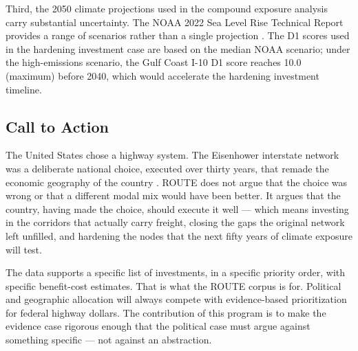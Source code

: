 Third, the 2050 climate projections used in the compound exposure analysis carry substantial uncertainty. The NOAA 2022 Sea Level Rise Technical Report provides a range of scenarios rather than a single projection \citep{NOAA_SLR2022}. The D1 scores used in the hardening investment case are based on the median NOAA scenario; under the high-emissions scenario, the Gulf Coast I-10 D1 score reaches 10.0 (maximum) before 2040, which would accelerate the hardening investment timeline.

\subsection{Call to Action}

The United States chose a highway system. The Eisenhower interstate network was a deliberate national choice, executed over thirty years, that remade the economic geography of the country \citep{Michaels2008,TRB_NHS2018}. ROUTE does not argue that the choice was wrong or that a different modal mix would have been better. It argues that the country, having made the choice, should execute it well --- which means investing in the corridors that actually carry freight, closing the gaps the original network left unfilled, and hardening the nodes that the next fifty years of climate exposure will test.

The data supports a specific list of investments, in a specific priority order, with specific benefit-cost estimates. That is what the ROUTE corpus is for. Political and geographic allocation will always compete with evidence-based prioritization for federal highway dollars. The contribution of this program is to make the evidence case rigorous enough that the political case must argue against something specific --- not against an abstraction.
